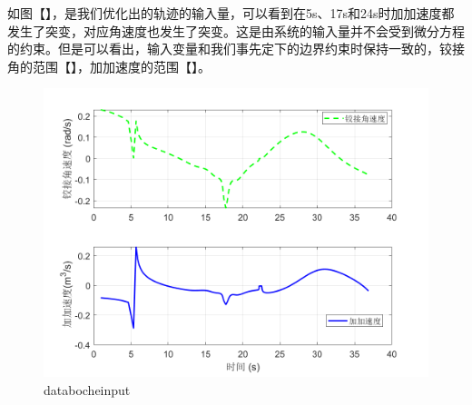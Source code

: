 \documentclass[master,academic]{ysuthesis} %
\begin{document}
		如图【】，是我们优化出的轨迹的输入量，可以看到在5s、17s和24s时加加速度都发生了突变，对应角速度也发生了突变。这是由系统的输入量并不会受到微分方程的约束。但是可以看出，输入变量和我们事先定下的边界约束时保持一致的，铰接角的范围【】，加加速度的范围【】。
		\begin{figure}[!ht]
			\centering
			\includegraphics[width=1\textwidth]{databocheinput.png}
			\caption{databocheinput}
			\label{fig:databocheinput}
		\end{figure}
\end{document}
